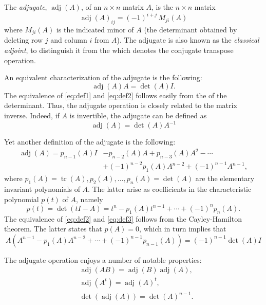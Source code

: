 \documentclass[12pt]{article}
\newcommand{\adj}{\operatorname{adj}}
\newcommand{\adjA}{\adj(A)}
\begin{document}
The \emph{adjugate}, $\adjA$, of an $n\times n$
matrix $A$, is the $n\times n$ matrix
\begin{equation}
  \label{eq:def1}
  \adjA_{ij} = (-1)^{i+j}\, M_{\!ji}(A) 
\end{equation}
where $M_{\!ji}(A)$ is the indicated minor of $A$ (the determinant
obtained by deleting row $j$ and column $i$ from $A$).  The adjugate
is also known as the \emph{classical adjoint}, to distinguish it from
the  which
denotes the conjugate transpose operation.


An equivalent characterization of the adjugate is the following:
\begin{equation}
  \label{eq:def2}
  \adjA A = \det(A) I.
\end{equation}
The equivalence of \eqref{eq:def1} and \eqref{eq:def2} follows easily
from the  of the determinant.
Thus, the adjugate operation is closely related to the matrix inverse.
Indeed, if $A$ is invertible, the adjugate can be defined as
\[ \adjA = \det(A)A^{-1} \]

Yet another definition of the adjugate is the following:
\begin{align}
  \label{eq:def3}
  \adjA = p_{n-1}(A) I &- p_{n-2}(A) A + p_{n-3}(A) A^2 - \cdots \\ \nonumber
  & +  (-1)^{n-2}p_1(A) A^{n-2} + (-1)^{n-1}A^{n-1},
\end{align}
where $p_1(A)=\operatorname{tr}(A), p_2(A),\ldots, p_n(A) = \det(A)$
are the elementary invariant polynomials of
$A$.  The latter arise as
coefficients in the
characteristic polynomial $p(t)$ of $A$, namely
\[p(t) = \det(t I - A) = t^n - p_1(A) t^{n-1} + \cdots + (-1)^n p_n(A).\]
The equivalence of \eqref{eq:def2} and \eqref{eq:def3} follows from
the Cayley-Hamilton theorem.  The latter states that $p(A)=0$, which
in turn implies that
 \[A ( A^{n-1} - p_1(A) A^{n-2} + \cdots + (-1)^{n-1} p_{n-1}(A) ) =
 (-1)^{n-1} \det(A) I\]

The adjugate operation enjoys  a number of notable
properties:
\begin{align}
  &\adj(AB) =\adj(B)\adj(A),\\
  &\adj(A^t) = \adjA^t,\\
  &\det(\adjA) = \det(A)^{n-1}.
\end{align}
\end{document}

